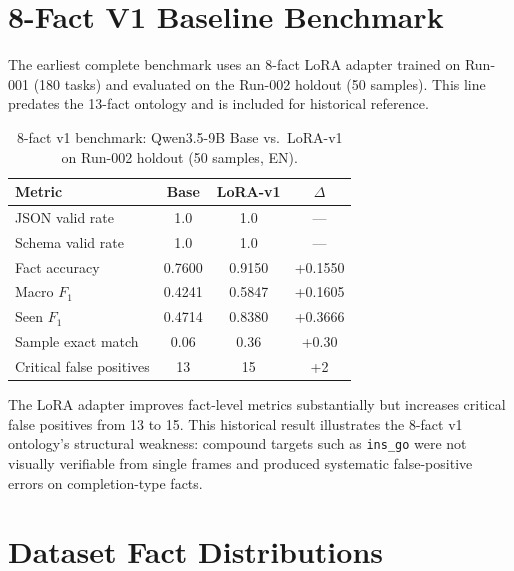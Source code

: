 \section{8-Fact V1 Baseline Benchmark}\label{sec:appendix-8fact}

The earliest complete benchmark uses an 8-fact LoRA adapter trained on Run-001
(180 tasks) and evaluated on the Run-002 holdout (50 samples). This line
predates the 13-fact ontology and is included for historical reference.

\begin{table}[htbp]
\centering
\caption{8-fact v1 benchmark: Qwen3.5-9B Base vs.\ LoRA-v1 on Run-002 holdout (50 samples, EN).}\label{tab:appendix-qwen-8fact}
\begin{tabular}{l c c c}
\toprule
\textbf{Metric} & \textbf{Base} & \textbf{LoRA-v1} & \textbf{$\Delta$} \\
\midrule
JSON valid rate       & 1.0    & 1.0    & --- \\
Schema valid rate     & 1.0    & 1.0    & --- \\
Fact accuracy         & 0.7600 & 0.9150 & +0.1550 \\
Macro $F_1$           & 0.4241 & 0.5847 & +0.1605 \\
Seen $F_1$            & 0.4714 & 0.8380 & +0.3666 \\
Sample exact match    & 0.06   & 0.36   & +0.30 \\
Critical false positives & 13  & 15     & +2 \\
\bottomrule
\end{tabular}
\end{table}


The LoRA adapter improves fact-level metrics substantially but increases
critical false positives from 13 to 15. This historical result illustrates the
8-fact v1 ontology's structural weakness: compound targets such as
\texttt{ins\_go} were not visually verifiable from single frames and produced
systematic false-positive errors on completion-type facts.

\section{Dataset Fact Distributions}\label{sec:appendix-datasets}


